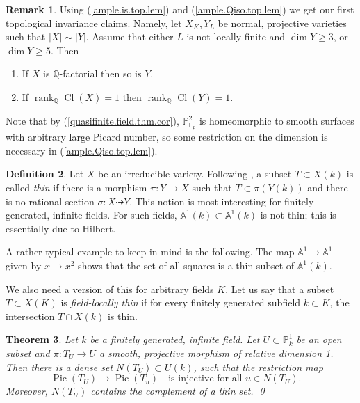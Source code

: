 \documentclass{amsart}
\newtheorem{thm}{Theorem}%
\theoremstyle{definition}
\newtheorem{defn}[thm]{Definition}
\newtheorem{rem}[thm]{Remark}
\theoremstyle{remark}
\renewcommand{\a}[0]{{\mathbb A}}
\newcommand{\p}[0]{{\mathbb P}}
\newcommand{\f}[0]{{\mathbb F}}
\newcommand{\q}[0]{{\mathbb Q}}
\newcommand{\map}[0]{\dasharrow}
\newcommand{\qtq}[1]{\quad\mbox{#1}\quad}
\newcommand{\pic}[0]{\operatorname{Pic}}
\newcommand{\qrank}[0]{\operatorname{rank}_{\q}}
\newcommand{\cl}[0]{\operatorname{Cl}}
\begin{document}
\begin{rem}\label{ample.Qiso.top.lem.rem} Using 
(\ref{ample.is.top.lem}) and (\ref{ample.Qiso.top.lem}) we get our first topological invariance claims. Namely,  
 let $X_K,Y_L$ be  normal, projective varieties such that $|X|\sim |Y|$.
Assume that  
 either $L$ is not locally finite and $\dim Y\geq 3$,
 or  $\dim Y\geq 5$.
Then 
\begin{enumerate}%
\item  If $X$ is $\q$-factorial then so is $Y$.
\item If $\qrank\cl(X)=1$ then $\qrank\cl(Y)=1$.
\end{enumerate}

Note that by (\ref{quasifinite.field.thm.cor}),   $\p^2_{\f_p}$ is homeomorphic to  smooth surfaces
with arbitrary large Picard number, so some restriction on the dimension is necessary in (\ref{ample.Qiso.top.lem}). 
\end{rem}




\medskip

\begin{defn}\label{thin.flt.defn}
 Let $X$ be an irreducible variety. 
Following \cite{MR1002324},  a
 subset  $T\subset X(k)$ is 
called {\it thin}  if there is a morphism  $\pi:Y\to X$
such that $T\subset \pi(Y(k))$ and there is no rational section $\sigma:X\map Y$.  This notion is most interesting for
finitely generated, infinite fields. For such fields, 
$\a^1(k)\subset \a^1(k)$ is not thin; this is essentially due to Hilbert. 

A rather typical example to keep in mind is the following.
The map $\a^1\to \a^1$ given by $x\to x^2$ shows that the set of all squares is a thin subset of $\a^1(k)$.  

We also need a version of this for arbitrary fields $K$. 
Let us say that a subset  $T\subset X(K)$ is  {\it field-locally thin}
if for every finitely generated subfield  $k\subset K$, the intersection
$T\cap X(k)$ is thin.
\end{defn}
 

\begin{thm}\cite[Thm.6]{MR56951}\label{neron.thm}
 Let $k$ be a finitely generated, infinite field. 
Let $U\subset \p^1_k$ be an open subset and $\pi: T_U\to U$  a smooth, projective morphism of relative dimension 1.  
Then there is a dense set
$N(T_U)\subset U(k)$, such that  the restriction map
$$
\pic(T_U)\to \pic(T_u)\qtq{is injective for all $u\in N(T_U)$.}
$$ 
Moreover, $N(T_U)$ contains the complement of a  thin set.  \qed
\end{thm}
\end{document}
